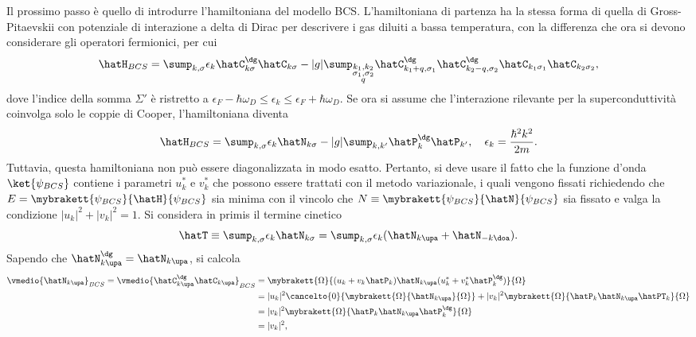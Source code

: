 Il prossimo passo è quello di introdurre l'hamiltoniana del modello BCS. L'hamiltoniana di partenza ha la stessa forma di quella di Gross-Pitaevskii con potenziale di interazione a delta di Dirac per descrivere i gas diluiti a bassa temperatura, con la differenza che ora si devono considerare gli operatori fermionici, per cui 
\begin{equation}
    \hatH_{BCS} = \sump_{k,\sigma}\epsilon_k\hatC^\dg_{k\sigma}\hatC_{k\sigma} - |g|\sump_{\substack{k_1,k_2 \\ \sigma_1,\sigma_2 \\
    q}}\hatC^\dg_{k_1 + q,\sigma_1}\hatC^\dg_{k_2 - q,\sigma_2}\hatC_{k_1\sigma_1}\hatC_{k_2\sigma_2},
\end{equation}
dove l'indice della somma $\Sigma'$ è ristretto a $\epsilon_F - \hbar\omega_D \le \epsilon_k \le \epsilon_F + \hbar\omega_D$. Se ora si assume che l'interazione rilevante per la superconduttività coinvolga solo le coppie di Cooper, l'hamiltoniana diventa
\begin{equation}
    \hatH_{BCS} = \sump_{k,\sigma}\epsilon_k\hatN_{k\sigma} - |g|\sump_{k,k'}\hatP^\dg_k\hatP_{k'},\quad \epsilon_k = \frac{\hbar^2k^2}{2m}.
\end{equation}
Tuttavia, questa hamiltoniana non può essere diagonalizzata in modo esatto. Pertanto, si deve usare il fatto che la funzione d'onda $\ket{\psi_{BCS}}$ contiene i parametri $u_k^*$ e $v_k^*$ che possono essere trattati con il metodo variazionale, i quali vengono fissati richiedendo che $E = \mybrakett{\psi_{BCS}}{\hatH}{\psi_{BCS}}$ sia minima con il vincolo che $N \equiv \mybrakett{\psi_{BCS}}{\hatN}{\psi_{BCS}}$ sia fissato e valga la condizione $|u_k|^2 + |v_k|^2 = 1$. Si considera in primis il termine cinetico
\begin{equation}
    \hatT \equiv \sump_{k,\sigma}\epsilon_k\hatN_{k\sigma} = \sump_{k,\sigma}\epsilon_k(\hatN_{k\upa} + \hatN_{-k\doa}).
\end{equation}
Sapendo che $\hatN^\dg_{k\upa} = \hatN_{k\upa}$, si calcola
\begin{equation}
    \begin{split}
        \vmedio{\hatN_{k\upa}}_{BCS} = \vmedio{\hatC^\dg_{k\upa}\hatC_{k\upa}}_{BCS} &= \mybrakett{\Omega}{(u_k + v_k\hatP_k)\hatN_{k\upa}(u_k^* + v_k^*\hatP_k^\dg)}{\Omega} \\
        &= |u_k|^2\cancelto{0}{\mybrakett{\Omega}{\hatN_{k\upa}}{\Omega}} + |v_k|^2\mybrakett{\Omega}{\hatP_k\hatN_{k\upa}\hatPT_k}{\Omega} \\
        &= |v_k|^2\mybrakett{\Omega}{\hatP_k\hatN_{k\upa}\hatP_k^\dg}{\Omega} \\
        &= |v_k|^2,
    \end{split}
\end{equation}

